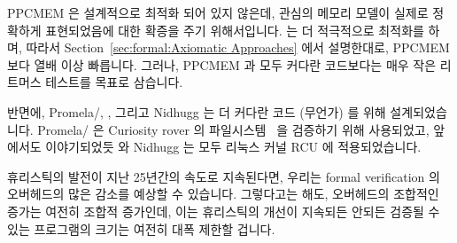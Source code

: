 PPCMEM 은 설계적으로 최적화 되어 있지 않은데, 관심의 메모리 모델이 실제로
정확하게 표현되었음에 대한 확증을 주기 위해서입니다.
 는 더 적극적으로 최적화를 하며, 따라서
Section~\ref{sec:formal:Axiomatic Approaches} 에서 설명한대로, PPCMEM 보다 열배
이상 빠릅니다.
그러나, PPCMEM 과  모두 커다란 코드보다는 매우 작은 리트머스 테스트를
목표로 삼습니다.
\iffalse

Almost all hard-core formal-verification tools are exponential
in nature, which might seem discouraging until you consider that
many of the most interesting software questions are in fact undecidable.
However, there are differences in degree, even among exponentials.

PPCMEM by design is unoptimized, in order to provide greater assurance
that the memory models of interest are in fact accurately represented.
The \co{herd} tool optimizes more aggressively, and so as described in
Section~\ref{sec:formal:Axiomatic Approaches}, is orders of magnitude
faster than PPCMEM.
Nevertheless, both PPCMEM and \co{herd} target very small litmus tests
rather than larger bodies of code.
\fi

반면에, Promela/, , 그리고 Nidhugg 는 더 커다란 코드 (무언가)
를 위해 설계되었습니다.
Promela/ 은 Curiosity rover 의
파일시스템~\cite{DBLP:journals/amai/GroceHHJX14} 을 검증하기 위해 사용되었고,
앞에서도 이야기되었듯  와 Nidhugg 는 모두 리눅스 커널 RCU 에
적용되었습니다.

휴리스틱의 발전이 지난 25년간의 속도로 지속된다면, 우리는 formal verification
의 오버헤드의 많은 감소를 예상할 수 있습니다.
그렇다고는 해도, 오버헤드의 조합적인 증가는 여전히 조합적 증가인데, 이는
휴리스틱의 개선이 지속되든 안되든 검증될 수 있는 프로그램의 크기는 여전히 대폭
제한할 겁니다.
\iffalse

In contrast, Promela/\co{spin}, \co{cbmc}, and Nidhugg are designed for
(somewhat) larger bodies of code.
Promela/\co{spin} was used to verify the Curiosity rover's
filesystem~\cite{DBLP:journals/amai/GroceHHJX14} and, as noted earlier,
both \co{cbmc} and Nidhugg were appled to Linux-kernel RCU.

If advances in heuristics continue at the rate of the past quarter
century, we can look forward to large reductions in overhead for
formal verification.
That said, combinatorial explosion is still combinatorial explosion,
which would be expected to sharply limit the size of programs that
could be verified, with or without continued improvements in
heuristics.
\fi

